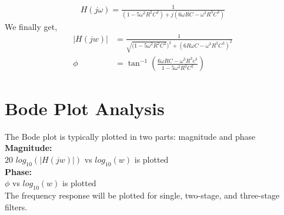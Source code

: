 \documentclass[a4paper,12pt]{article}
\begin{document}
\begin{align*}
H(j\omega) = \frac{1}{(1-5\omega^2R^2C^2) + j(6\omega RC - \omega^3R^3C^3)}
\end{align*}
We finally get,
\begin{align*}
    |H(jw)| &= \frac{1}{\sqrt{(1 - 5\omega^2 R^2 C^2})^2 +(6R\omega C - \omega^3R^3C^3)^2} \\
    \phi &= \tan^{-1}\left( \frac{6\omega RC- \omega^3R^3c^3}{1-5\omega^2R^2C^2}\right)
\end{align*}
\section{Bode Plot Analysis}
The Bode plot is typically plotted in two parts: magnitude and phase\\

\textbf{Magnitude:}\\
$20$ $log_{10}(|H(jw)|)$ vs $log_{10}(w)$ is plotted\\

\textbf{Phase:}\\
$\phi$ vs $log_{10}(w)$ is plotted\\

The frequency response will be plotted for single, two-stage, and three-stage filters.
\end{document}
